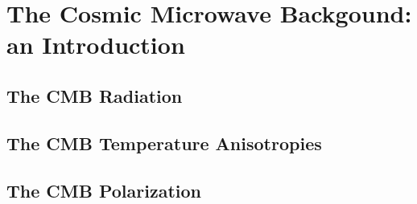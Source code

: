 \chapter{The Cosmic Microwave Backgound: an Introduction}

\section{The CMB Radiation}

\section{The CMB Temperature Anisotropies}

\section{The CMB Polarization}
